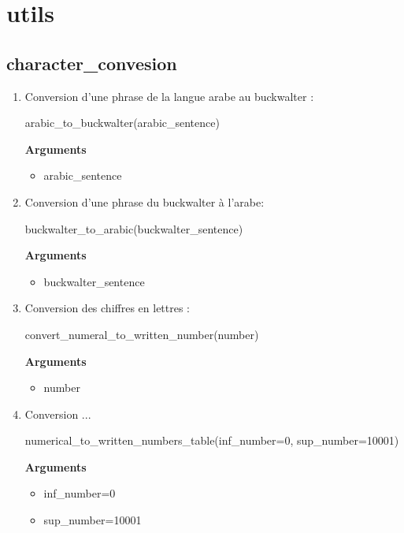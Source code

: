 \section{utils}
    \subsection{character\_convesion}
    \begin{enumerate}
        \item Conversion d'une phrase de la langue arabe au buckwalter :
        \begin{tcolorbox}
        arabic\_to\_buckwalter(arabic\_sentence)
        \end{tcolorbox}
        \textbf{Arguments}
        \begin{itemize}
            \item arabic\_sentence
        \end{itemize}
        \item Conversion d'une phrase du buckwalter à l'arabe:
        \begin{tcolorbox}
        buckwalter\_to\_arabic(buckwalter\_sentence)
        \end{tcolorbox}
        \textbf{Arguments}
        \begin{itemize}
            \item buckwalter\_sentence
        \end{itemize}
        \item Conversion des chiffres en lettres :
        \begin{tcolorbox}
        convert\_numeral\_to\_written\_number(number)
        \end{tcolorbox}
        \textbf{Arguments}
        \begin{itemize}
            \item number
        \end{itemize}
        \item Conversion ...
        \begin{tcolorbox}
        numerical\_to\_written\_numbers\_table(inf\_number=0, sup\_number=10001)
        \end{tcolorbox}
        \textbf{Arguments}
        \begin{itemize}
            \item inf\_number=0
            \item sup\_number=10001
        \end{itemize}
    \end{enumerate}

